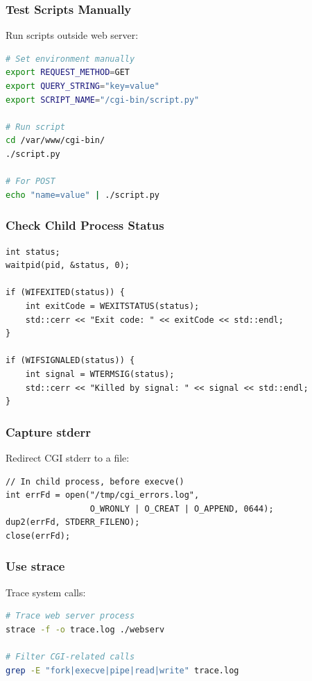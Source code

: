 \documentclass[11pt,a4paper]{article}
\begin{document}
\subsubsection{Test Scripts Manually}

Run scripts outside web server:

\begin{lstlisting}[language=bash]
# Set environment manually
export REQUEST_METHOD=GET
export QUERY_STRING="key=value"
export SCRIPT_NAME="/cgi-bin/script.py"

# Run script
cd /var/www/cgi-bin/
./script.py

# For POST
echo "name=value" | ./script.py
\end{lstlisting}

\subsubsection{Check Child Process Status}

\begin{lstlisting}
int status;
waitpid(pid, &status, 0);

if (WIFEXITED(status)) {
    int exitCode = WEXITSTATUS(status);
    std::cerr << "Exit code: " << exitCode << std::endl;
}

if (WIFSIGNALED(status)) {
    int signal = WTERMSIG(status);
    std::cerr << "Killed by signal: " << signal << std::endl;
}
\end{lstlisting}

\subsubsection{Capture stderr}

Redirect CGI stderr to a file:

\begin{lstlisting}
// In child process, before execve()
int errFd = open("/tmp/cgi_errors.log",
                 O_WRONLY | O_CREAT | O_APPEND, 0644);
dup2(errFd, STDERR_FILENO);
close(errFd);
\end{lstlisting}

\subsubsection{Use strace}

Trace system calls:

\begin{lstlisting}[language=bash]
# Trace web server process
strace -f -o trace.log ./webserv

# Filter CGI-related calls
grep -E "fork|execve|pipe|read|write" trace.log
\end{lstlisting}
\end{document}
